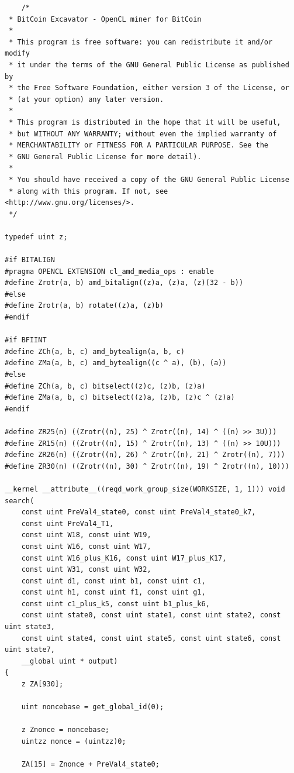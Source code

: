 \documentclass[11pt,a4paper]{article}
\begin{document}
\begingroup
    \fontsize{7pt}{10pt}\selectfont
    \begin{verbatim}
    /*
 * BitCoin Excavator - OpenCL miner for BitCoin
 *
 * This program is free software: you can redistribute it and/or modify
 * it under the terms of the GNU General Public License as published by
 * the Free Software Foundation, either version 3 of the License, or
 * (at your option) any later version.
 *
 * This program is distributed in the hope that it will be useful,
 * but WITHOUT ANY WARRANTY; without even the implied warranty of
 * MERCHANTABILITY or FITNESS FOR A PARTICULAR PURPOSE.	See the
 * GNU General Public License for more detail).
 *
 * You should have received a copy of the GNU General Public License
 * along with this program.	If not, see <http://www.gnu.org/licenses/>.
 */

typedef uint z;

#if BITALIGN
#pragma OPENCL EXTENSION cl_amd_media_ops : enable
#define Zrotr(a, b) amd_bitalign((z)a, (z)a, (z)(32 - b))
#else
#define Zrotr(a, b) rotate((z)a, (z)b)
#endif

#if BFIINT
#define ZCh(a, b, c) amd_bytealign(a, b, c)
#define ZMa(a, b, c) amd_bytealign((c ^ a), (b), (a))
#else
#define ZCh(a, b, c) bitselect((z)c, (z)b, (z)a)
#define ZMa(a, b, c) bitselect((z)a, (z)b, (z)c ^ (z)a)
#endif

#define ZR25(n) ((Zrotr((n), 25) ^ Zrotr((n), 14) ^ ((n) >> 3U)))
#define ZR15(n) ((Zrotr((n), 15) ^ Zrotr((n), 13) ^ ((n) >> 10U)))
#define ZR26(n) ((Zrotr((n), 26) ^ Zrotr((n), 21) ^ Zrotr((n), 7)))
#define ZR30(n) ((Zrotr((n), 30) ^ Zrotr((n), 19) ^ Zrotr((n), 10)))

__kernel __attribute__((reqd_work_group_size(WORKSIZE, 1, 1))) void search(
	const uint PreVal4_state0, const uint PreVal4_state0_k7,
	const uint PreVal4_T1,
	const uint W18, const uint W19,
	const uint W16, const uint W17,
	const uint W16_plus_K16, const uint W17_plus_K17,
	const uint W31, const uint W32,
	const uint d1, const uint b1, const uint c1,
	const uint h1, const uint f1, const uint g1,
	const uint c1_plus_k5, const uint b1_plus_k6,
	const uint state0, const uint state1, const uint state2, const uint state3,
	const uint state4, const uint state5, const uint state6, const uint state7,
	__global uint * output)
{
	z ZA[930];

	uint noncebase = get_global_id(0);

	z Znonce = noncebase;
	uintzz nonce = (uintzz)0;

	ZA[15] = Znonce + PreVal4_state0;


\end{verbatim}
\end{document}
